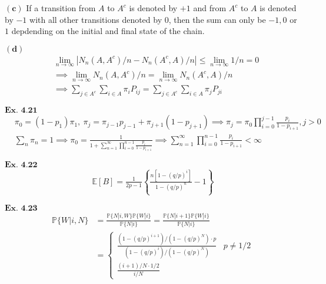 \documentclass{article}
\begin{document}
$\mathbf{(c)}$
If a transition from $A$ to $A^c$ is denoted by $+1$ and from $A^{c}$ to $A$ is denoted by $-1$ with all other transitions denoted by $0$, then the sum can only be $-1, 0$ or $1$ depdending on the initial and final state of the chain. 

$\mathbf{(d)}$
\begin{align*}
&\lim_{n\rightarrow \infty}|N_{n}(A,A^{c})/n-N_{n}(A^{c},A)/n| \leq \lim_{n\rightarrow \infty}1/n = 0 \\
&\implies \lim_{n\rightarrow \infty}N_{n}(A,A^{c})/n = \lim_{n\rightarrow \infty}N_{n}(A^c,A)/n\\
&\implies \sum_{j\in A^c}\sum_{i\in A}\pi_{i}P_{ij} = \sum_{j \in A^c}\sum_{i \in A}\pi_j P_{ji}
\end{align*}

\vspace{0.2in}
\begin{comment}
${\textbf{Ex. 4.20}}$

\vspace{0.2in}
\end{comment}
${\textbf{Ex. 4.21}}$
\begin{align*}
&\pi_{0} = (1-p_1) \pi_1, \ \pi_{j} = \pi_{j-1}p_{j-1} + \pi_{j+1}(1-p_{j+1}) \implies \pi_j = \pi_0\prod_{i=0}^{j-1}\frac{p_i}{1-p_{i+1}}, j > 0\\
& \sum_{n}\pi_n = 1 \implies \pi_0 = \frac{1}{1+\sum_{n=1}^{\infty}\prod_{i=0}^{n-1}\frac{p_i}{1-p_{i+1}}} \implies \sum_{n=1}^{\infty}\prod_{i=0}^{n-1}\frac{p_i}{1-p_{i+1}} < \infty
\end{align*}

\vspace{0.2in}
${\textbf{Ex. 4.22}}$
\begin{align*}
\mathbb{E}[B] = \frac{1}{2p-1}\left\{\frac{n[1-(q/p)^i]}{1-(q/p)^n} - 1\right\}
\end{align*}

\vspace{0.2in}
${\textbf{Ex. 4.23}}$
\begin{align*}
\mathbb{P}\{W|i,N\} &= \frac{\mathbb{P}\{N|i,W\}\mathbb{P}\{W|i\}}{\mathbb{P}\{N|i\}} = \frac{\mathbb{P}\{N|i+1\}\mathbb{P}\{W|i\}}{\mathbb{P}\{N|i\}}\\
&= \left\{\begin{matrix}\frac{(1-(q/p)^{i+1})/(1-(q/p)^N)\cdot p}{(1-(q/p)^i)/(1-(q/p)^N)} & p\neq 1/2\\ \frac{(i+1)/N\cdot 1/2}{i/N}\end{matrix}\right.
\end{align*}
\end{document}
